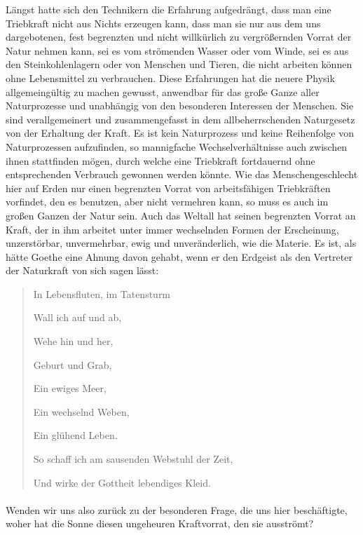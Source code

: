 \documentclass[a4paper, 11pt, oneside, german]{article}
\begin{document}
Längst hatte sich den Technikern die Erfahrung aufgedrängt, dass man eine Triebkraft nicht aus Nichts erzeugen kann, dass man sie nur aus dem uns dargebotenen, fest begrenzten und nicht willkürlich zu vergrößernden Vorrat der Natur nehmen kann, sei es vom strömenden Wasser oder vom Winde, sei es aus den Steinkohlenlagern oder von Menschen und Tieren, die nicht arbeiten können ohne Lebensmittel zu verbrauchen. Diese Erfahrungen hat die neuere Physik allgemeingültig zu machen gewusst, anwendbar für das große Ganze aller Naturprozesse und unabhängig von den besonderen Interessen der Menschen. Sie sind verallgemeinert und zusammengefasst in dem allbeherrschenden Naturgesetz von der Erhaltung der Kraft. Es ist kein Naturprozess und keine Reihenfolge von Naturprozessen aufzufinden, so mannigfache Wechselverhältnisse auch zwischen ihnen stattfinden mögen, durch welche eine Triebkraft fortdauernd ohne entsprechenden Verbrauch gewonnen werden könnte. Wie das Menschengeschlecht hier auf Erden nur einen begrenzten Vorrat von arbeitsfähigen Triebkräften vorfindet, den es benutzen, aber nicht vermehren kann, so muss es auch im großen Ganzen der Natur sein. Auch das Weltall hat seinen begrenzten Vorrat an Kraft, der in ihm arbeitet unter immer wechselnden Formen der Erscheinung, unzerstörbar, unvermehrbar, ewig und unveränderlich, wie die Materie. Es ist, als hätte Goethe eine Ahnung davon gehabt, wenn er den Erdgeist als den Vertreter der Naturkraft von sich sagen lässt:
\begin{quotation}
In Lebensfluten, im Tatensturm

Wall ich auf und ab,

Wehe hin und her,

Geburt und Grab,

Ein ewiges Meer,

Ein wechselnd Weben,

Ein glühend Leben.

So schaff ich am sausenden Webstuhl der Zeit,

Und wirke der Gottheit lebendiges Kleid.
\end{quotation}
\paragraph{}
Wenden wir uns also zurück zu der besonderen Frage, die uns hier beschäftigte, woher hat die Sonne diesen ungeheuren Kraftvorrat, den sie ausströmt?
\end{document}
